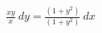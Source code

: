 \documentclass[preview]{standalone}
\begin{document}
\begin{align*}
\frac{x y}{x} \  dy = \frac{\left( 1 + {y}^{2} \right)}{\left( 1 + {y}^{2} \right)} \  dx
\end{align*}
\end{document}
